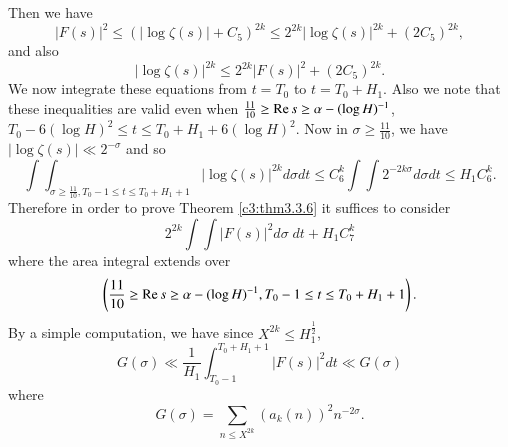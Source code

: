 Then we have
\begin{equation*}
|F(s)|^2 \leq (|\log \zeta(s)| + C_5)^{2k} \leq 2^{2k} |\log \zeta(s)|^{2k} + (2C_5)^{2k}, \tag{3.3.20}\label{c3:eq3.3.20}
\end{equation*}
and also
\begin{equation*}
|\log \zeta(s)|^{2k} \leq 2^{2k} |F(s)|^2 + (2C_5)^{2k} . \tag{3.3.21}\label{c3:eq3.3.21}
\end{equation*}
We now integrate these equations from $t = T_0$ to $t = T_0 + H_1$. Also we note that these inequalities are valid even when $\frac{11}{10} \geq \operatorname{Re} s \geq \alpha - (\log H)^{-1}$, $T_0 - 6 (\log H)^2 \leq t \leq T_0 + H_1 + 6(\log H)^2$. Now in $\sigma \geq \frac{11}{10}$, we have $|\log \zeta(s)| \ll 2^{-\sigma}$ and so 
{\fontsize{10}{12}\selectfont
\begin{equation*}
\int \int_{\sigma \geq \frac{11}{10}, T_0 -1 \leq t \leq T_0 + H_1 + 1} |\log \zeta(s)|^{2k} d \sigma dt \leq C^{k}_6 \int \int 2^{-2k\sigma} d\sigma dt \leq H_1 C^k_6. 
\tag{3.3.22}\label{c3:eq3.3.22}
\end{equation*}}
Therefore in order to prove Theorem \ref{c3:thm3.3.6} it suffices to consider
\begin{equation*}
2^{2k} \int \int |F(s)|^2 d\sigma \; dt + H_1 C^k_7
\tag{3.3.23}\label{c3:eq3.3.23}
\end{equation*}
where the area integral extends over
$$
\left(\frac{11}{10} \geq \operatorname{Re} s \geq \alpha - (\log H)^{-1}, T_0 -1 \leq t \leq T_0 + H_1 + 1 \right).
$$
By a simple computation, we have since $X^{2k} \leq H^{\frac{1}{2}}_1$,
\begin{equation*}
G(\sigma) \ll \frac{1}{H_1} \int^{T_0 + H_1 +1}_{T_0 -1} |F(s)|^2 dt \ll G(\sigma) \tag{3.3.24}\label{c3:eq3.3.24}
\end{equation*}
where 
\begin{equation*}
G(\sigma) = \sum\limits_{n\leq X^{2k}} (a_k(n))^2 n^{-2\sigma}. 
\tag{3.3.25}\label{c3:eq3.3.25}
\end{equation*}

